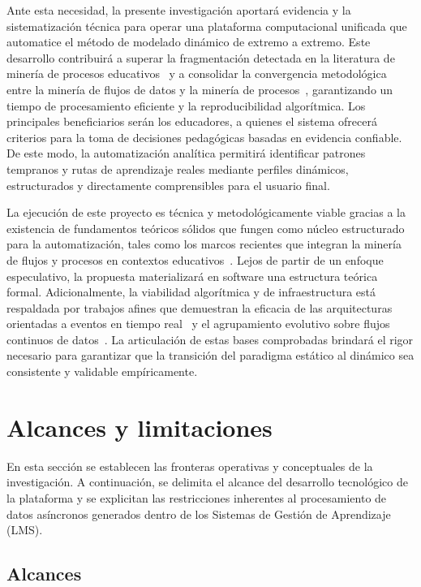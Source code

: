 Ante esta necesidad, la presente investigación aportará evidencia y la sistematización técnica para operar una plataforma computacional unificada que automatice el método de modelado dinámico de extremo a extremo. Este desarrollo contribuirá a superar la fragmentación detectada en la literatura de minería de procesos educativos~\cite{Semler2025} y a consolidar la convergencia metodológica entre la minería de flujos de datos y la minería de procesos~\cite{YeseniaZavaleta-Sanchez2025}, garantizando un tiempo de procesamiento eficiente y la reproducibilidad algorítmica. Los principales beneficiarios serán los educadores, a quienes el sistema ofrecerá criterios para la toma de decisiones pedagógicas basadas en evidencia confiable. De este modo, la automatización analítica permitirá identificar patrones tempranos y rutas de aprendizaje reales mediante perfiles dinámicos, estructurados y directamente comprensibles para el usuario final.

La ejecución de este proyecto es técnica y metodológicamente viable gracias a la existencia de fundamentos teóricos sólidos que fungen como núcleo estructurado para la automatización, tales como los marcos recientes que integran la minería de flujos y procesos en contextos educativos~\cite{YeseniaZavaleta-Sanchez2025}. Lejos de partir de un enfoque especulativo, la propuesta materializará en software una estructura teórica formal. Adicionalmente, la viabilidad algorítmica y de infraestructura está respaldada por trabajos afines que demuestran la eficacia de las arquitecturas orientadas a eventos en tiempo real~\cite{Kundavaram2025} y el agrupamiento evolutivo sobre flujos continuos de datos~\cite{Batool2021}. La articulación de estas bases comprobadas brindará el rigor necesario para garantizar que la transición del paradigma estático al dinámico sea consistente y validable empíricamente.

\section{Alcances y limitaciones}

En esta sección se establecen las fronteras operativas y conceptuales de la investigación. A continuación, se delimita el alcance del desarrollo tecnológico de la plataforma y se explicitan las restricciones inherentes al procesamiento de datos asíncronos generados dentro de los Sistemas de Gestión de Aprendizaje (LMS).

\subsection{Alcances}

